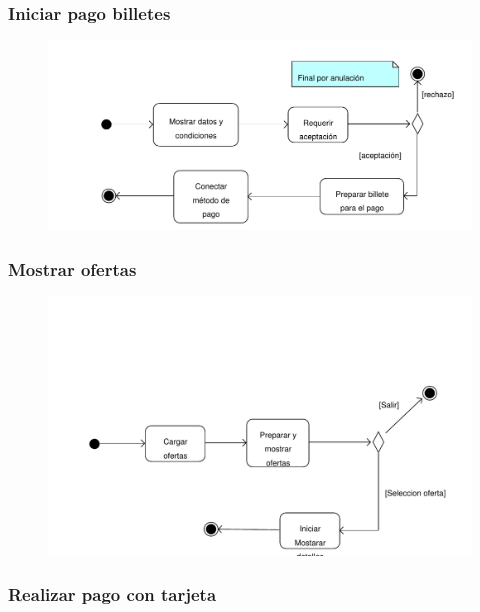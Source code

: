 \documentclass[11pt, a4paper, twoside, titlepage]{article}
\begin{document}
			\subsubsection{Iniciar pago billetes}
				\begin{figure}[H]\centering
					\includegraphics[scale=.76]{diagramas/da_iniciarpagobilletes.pdf}
				\end{figure}

			\subsubsection{Mostrar ofertas}
				\begin{figure}[H]\centering
				\includegraphics[scale=.72]{diagramas/da_mostrarofertas.pdf}
				\end{figure}

			\subsubsection{Realizar pago con tarjeta}
				\begin{figure}[H]\centering
				\end{figure}
\end{document}
